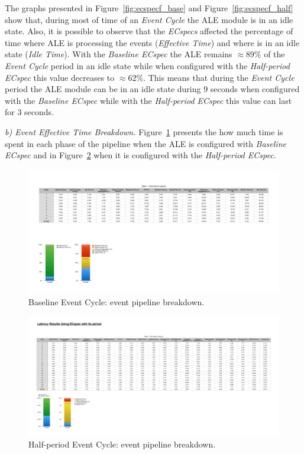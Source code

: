 The graphs presented in Figure~\ref{fig:ecspecf_base} and Figure~\ref{fig:ecspecf_half} show that,
during most of time of an \textit{Event Cycle} the \gls{ALE} module is in an idle state.
Also, it is possible to observe that the \textit{ECspecs} affected the percentage of time where
\gls{ALE} is processing the events (\textit{Effective Time}) and where is in an idle state (\textit{Idle Time}).
With the \textit{Baseline ECspec} the \gls{ALE} remains $\approx89\%$ of the \textit{Event Cycle} period
in an idle state while when configured with the \textit{Half-period ECspec} this value decreases to
$\approx62\%$. This means that during the \textit{Event Cycle} period the \gls{ALE} module can be in
an idle state during 9 seconds when configured with the \textit{Baseline ECspec} while with the
\textit{Half-period ECspec} this value can last for 3 seconds.

\textit{b) Event Effective Time Breakdown.}
Figure~\ref{fig:ecspecf_effective_base} presents the how much time is spent in each phase of
the pipeline when the \gls{ALE} is configured with \textit{Baseline ECspec} and in
Figure~\ref{fig:ecspecf_effective_half} when it is configured with the \textit{Half-period ECspec}.

\begin{figure}[ht!]
  \centering
  \includegraphics[width=.7\linewidth]{./figures/cloud_ecspec_effective_breakdown}
  \caption{Baseline Event Cycle: event pipeline breakdown.}
  \label{fig:ecspecf_effective_base}
\end{figure}

\begin{figure}[ht!]
  \centering
  \includegraphics[width=.7\linewidth]{./figures/cloud_ecspecf_effective_breakdown}
  \caption{Half-period Event Cycle: event pipeline breakdown.}
  \label{fig:ecspecf_effective_half}
\end{figure}

